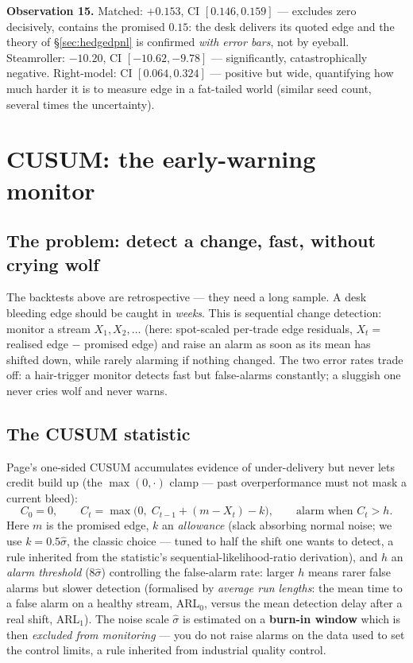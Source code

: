 \documentclass[11pt,a4paper]{article}
\begin{document}
\begin{obsbox}
\textbf{Observation 15.} Matched: $+0.153$, CI $[0.146,0.159]$ --- excludes
zero decisively, contains the promised $0.15$: the desk delivers its quoted
edge and the theory of \S\ref{sec:hedgedpnl} is confirmed \emph{with error
bars}, not by eyeball. Steamroller: $-10.20$, CI $[-10.62,-9.78]$ ---
significantly, catastrophically negative. Right-model: CI $[0.064,0.324]$ ---
positive but wide, quantifying how much harder it is to measure edge in a
fat-tailed world (similar seed count, several times the uncertainty).
\end{obsbox}

\section{CUSUM: the early-warning monitor}
\label{sec:cusum}

\subsection{The problem: detect a change, fast, without crying wolf}
The backtests above are retrospective --- they need a long sample. A desk
bleeding edge should be caught in \emph{weeks}. This is sequential change
detection: monitor a stream $X_1,X_2,\dots$ (here: spot-scaled per-trade edge
residuals, $X_t=$ realised edge $-$ promised edge) and raise an alarm as soon
as its mean has shifted down, while rarely alarming if nothing changed. The
two error rates trade off: a hair-trigger monitor detects fast but
false-alarms constantly; a sluggish one never cries wolf and never warns.

\subsection{The CUSUM statistic}
Page's one-sided CUSUM accumulates evidence of under-delivery but never lets
credit build up (the $\max(0,\cdot)$ clamp --- past overperformance must not
mask a current bleed):
\begin{equation}
C_0=0,\qquad
C_t=\max\big(0,\;C_{t-1}+(m-X_t)-k\big),\qquad
\text{alarm when } C_t>h .
\label{eq:cusum}
\end{equation}
Here $m$ is the promised edge, $k$ an \emph{allowance} (slack absorbing normal
noise; we use $k=0.5\hat\sigma$, the classic choice --- tuned to half the
shift one wants to detect, a rule inherited from the statistic's
sequential-likelihood-ratio derivation), and $h$ an \emph{alarm threshold}
($8\hat\sigma$) controlling the false-alarm rate: larger $h$ means rarer false
alarms but slower detection (formalised by \emph{average run lengths}: the
mean time to a false alarm on a healthy stream, ARL$_0$, versus the mean
detection delay after a real shift, ARL$_1$). The noise scale $\hat\sigma$ is
estimated on a \textbf{burn-in window} which is then \emph{excluded from
monitoring} --- you do not raise alarms on the data used to set the control
limits, a rule inherited from industrial quality control.
\end{document}
